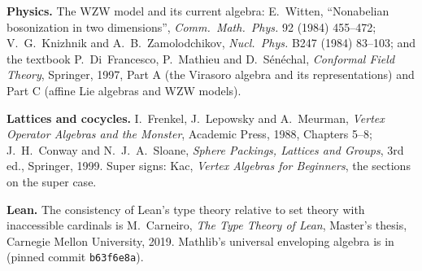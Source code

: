\textbf{Physics.} The WZW model and its current algebra: E.~Witten, ``Nonabelian bosonization in two
dimensions'', \emph{Comm.\ Math.\ Phys.} 92 (1984) 455--472; V.~G.~Knizhnik and A.~B.~Zamolodchikov,
\emph{Nucl.\ Phys.} B247 (1984) 83--103; and the textbook P.~Di~Francesco, P.~Mathieu and
D.~S\'en\'echal, \emph{Conformal Field Theory}, Springer, 1997, Part A (the Virasoro algebra and its
representations) and Part C (affine Lie algebras and WZW models).

\textbf{Lattices and cocycles.} I.~Frenkel, J.~Lepowsky and A.~Meurman, \emph{Vertex Operator Algebras
and the Monster}, Academic Press, 1988, Chapters 5--8; J.~H.~Conway and N.~J.~A.~Sloane, \emph{Sphere
Packings, Lattices and Groups}, 3rd ed., Springer, 1999. Super signs: Kac, \emph{Vertex Algebras for
Beginners}, the sections on the super case.

\textbf{Lean.} The consistency of Lean's type theory relative to set theory with inaccessible cardinals is
M.~Carneiro, \emph{The Type Theory of Lean}, Master's thesis, Carnegie Mellon University, 2019. Mathlib's
universal enveloping algebra is in 
(pinned commit \texttt{b63f6e8a}).

\endgroup
